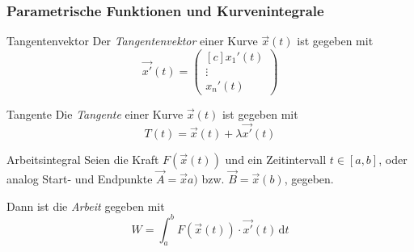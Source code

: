\documentclass[german]{../spicker}
\newcommand{\vektor}[1]{\begin{pmatrix*}[c] #1 \end{pmatrix*}}
\renewcommand{\d}{\,\mathrm{d}}
\newcommand{\interval}[1]{\left[ #1 \right]}
\begin{document}
\subsubsection{Parametrische Funktionen und Kurvenintegrale}

\begin{defi}{Tangentenvektor}
    Der \emph{Tangentenvektor} einer Kurve $\vec{x}(t)$ ist gegeben mit
    $$
        \vec{x'}(t) = \vektor{x_1'(t) \\ \vdots \\ x_n'(t)}
    $$
\end{defi}

\begin{defi}{Tangente}
    Die \emph{Tangente} einer Kurve $\vec{x}(t)$ ist gegeben mit
    $$
        T(t) = \vec{x}(t) + \lambda\vec{x'}(t)
    $$
\end{defi}

\begin{defi}{Arbeitsintegral}
    Seien die Kraft $F(\vec{x}(t))$ und ein Zeitintervall $t \in \interval{a,b}$, oder analog Start- und Endpunkte $\vec{A} = \vec{x}a)$ bzw. $\vec{B} = \vec{x}(b)$, gegeben.

    Dann ist die \emph{Arbeit} gegeben mit
    $$
        W = \int^b_a F(\vec{x}(t)) \cdot \vec{x'}(t) \d t
    $$
\end{defi}
\end{document}
